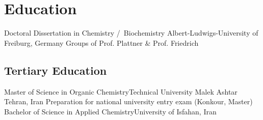 {          %


}{
  \section{Education}
           {Doctoral Dissertation in Chemistry \slash  ~Biochemistry} {Albert-Ludwigs-University of Freiburg, Germany  \newline Groups of Prof. Plattner \& Prof. Friedrich}{}{}{}
          \pagebreak
          \subsection{Tertiary Education}
           {Master of Science in Organic Chemistry}{Technical University Malek Ashtar Tehran, Iran}{}{}{}
           {Preparation for national university entry exam (Konkour, Master)}{}{}{}{}
           {Bachelor of Science in Applied Chemistry}{University of Isfahan, Iran}{}{}{}

}
